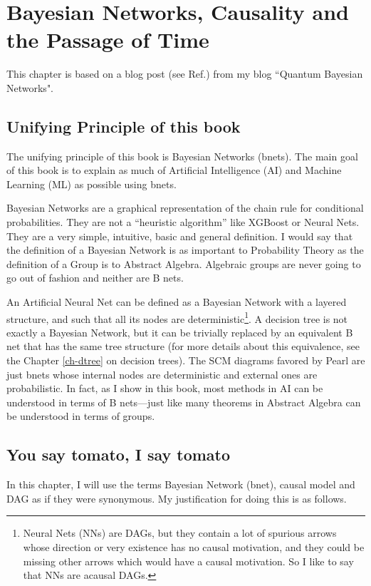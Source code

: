\chapter{Bayesian Networks, Causality and the
Passage of Time}

\label{ch0-passage-time}

This chapter is based
on a blog post (see Ref.\cite{bnets-passage-time})
from my blog ``Quantum Bayesian Networks".

\section{Unifying Principle of this book}
The unifying principle of this
book is Bayesian Networks (bnets).
The main goal of this book
is to explain
as much of Artificial Intelligence (AI)
and Machine Learning (ML)
as possible
using bnets.

Bayesian Networks are a graphical representation of the chain rule for
conditional probabilities.
 They are not a ``heuristic algorithm” like XGBoost or Neural Nets.
They are a very simple, intuitive, basic and general definition. I would say
that the definition of a Bayesian Network is as important to Probability
Theory as the definition of a Group is to Abstract Algebra. Algebraic groups
are never going to go out of fashion and neither are B nets.

An Artificial Neural Net can be defined as a Bayesian Network with a layered
structure, and such that all its nodes are deterministic\footnote{Neural Nets (NNs)
are DAGs, but they contain a lot of 
spurious arrows whose direction
or very existence has no causal motivation,
and they could be missing
other arrows which 
would have a causal motivation.
 So I like to
say that NNs are acausal DAGs.}. A decision tree
is not exactly a Bayesian Network, but it can be trivially replaced by an
equivalent B net that has the same tree structure (for more details about
this equivalence, see the Chapter \ref{ch-dtree} on decision trees).
The SCM diagrams favored by Pearl are just bnets
whose internal nodes are deterministic and external ones
are probabilistic.
In fact, as I show in this book, most methods in AI can be
understood in terms of B nets---just
like many theorems in Abstract Algebra
can be understood in terms of groups.



\section{You say tomato, I say tomato}
In this chapter, I will use the terms Bayesian Network
(bnet), causal model and DAG as if they were synonymous.
My justification for doing this is as follows.


